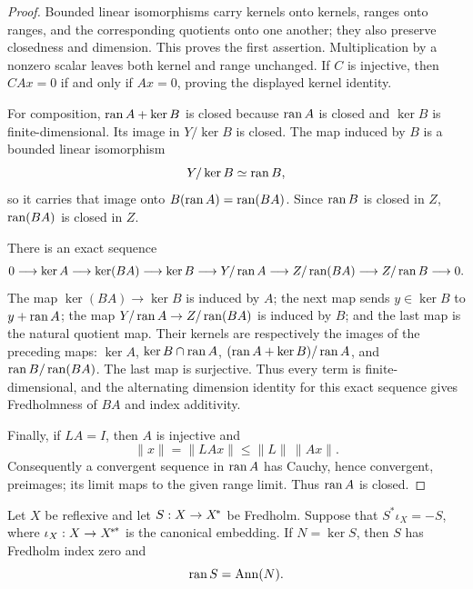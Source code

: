 \begin{proof}
Bounded linear isomorphisms carry kernels onto kernels, ranges onto ranges, and the corresponding
quotients onto one another; they also preserve closedness and dimension. This proves the first
assertion. Multiplication by a nonzero scalar leaves both kernel and range unchanged. If $C$ is
injective, then $CAx=0$ if and only if $Ax=0$, proving the displayed kernel identity.

For composition, $\operatorname{ran} A+\ker B$ is closed because $\operatorname{ran} A$ is closed and $\ker B$ is
finite-dimensional. Its image in $Y/\ker B$ is closed. The map induced by $B$ is a bounded
linear isomorphism
\[
  Y/\ker B\simeq\operatorname{ran} B,
\]
so it carries that image onto $B(\operatorname{ran} A)=\operatorname{ran}(BA)$. Since $\operatorname{ran} B$ is closed in $Z$,
$\operatorname{ran}(BA)$ is closed in $Z$.

There is an exact sequence
\[
0\longrightarrow\ker A\longrightarrow\ker(BA)\longrightarrow\ker B
\longrightarrow Y/\operatorname{ran} A\longrightarrow Z/\operatorname{ran}(BA)\longrightarrow Z/\operatorname{ran} B
\longrightarrow0.
\]
The map $\ker(BA)\to\ker B$ is induced by $A$; the next map sends $y\in\ker B$ to
$y+\operatorname{ran} A$; the map $Y/\operatorname{ran} A\to Z/\operatorname{ran}(BA)$ is induced by $B$; and the last map is the
natural quotient map. Their kernels are respectively the images of the preceding maps:
$\ker A$, $\ker B\cap\operatorname{ran} A$, $(\operatorname{ran} A+\ker B)/\operatorname{ran} A$, and
$\operatorname{ran} B/\operatorname{ran}(BA)$. The last map is surjective. Thus every term is finite-dimensional, and
the alternating dimension identity for this exact sequence gives Fredholmness of $BA$ and
index additivity.

Finally, if $LA=I$, then $A$ is injective and
\[
  \|x\|=\|LAx\|\leq\|L\|\,\|Ax\|.
\]
Consequently a convergent sequence in $\operatorname{ran} A$ has Cauchy, hence convergent, preimages; its limit
maps to the given range limit. Thus $\operatorname{ran} A$ is closed.
\end{proof}

\begin{lemma}\label{lem:skew-fredholm-range}
Let $X$ be reflexive and let $S:X\to{X}^{\!*}$ be Fredholm. Suppose that
$S^*\iota_X=-S$, where $\iota_X:X\to{{X}^{\!*}}^{\!*}$ is the canonical embedding. If
$N=\ker S$, then $S$ has Fredholm index zero and
\[
  \operatorname{ran} S=\operatorname{Ann}(N).
\]
\leanok
\end{lemma}

